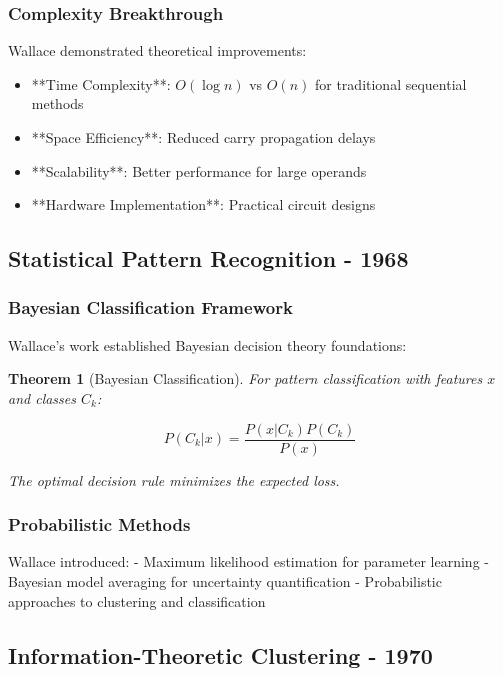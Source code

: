 \documentclass[12pt]{article}
\newtheorem{theorem}{Theorem}
\begin{document}
\subsubsection{Complexity Breakthrough}

Wallace demonstrated theoretical improvements:
\begin{itemize}
    \item **Time Complexity**: $O(\log n)$ vs $O(n)$ for traditional sequential methods
    \item **Space Efficiency**: Reduced carry propagation delays
    \item **Scalability**: Better performance for large operands
    \item **Hardware Implementation**: Practical circuit designs
\end{itemize}

\subsection{Statistical Pattern Recognition - 1968}

\subsubsection{Bayesian Classification Framework}

Wallace's work established Bayesian decision theory foundations:

\begin{theorem}[Bayesian Classification]
For pattern classification with features $x$ and classes $C_k$:

\begin{equation}
P(C_k|x) = \frac{P(x|C_k) P(C_k)}{P(x)}
\end{equation}

The optimal decision rule minimizes the expected loss.
\end{theorem}

\subsubsection{Probabilistic Methods}

Wallace introduced:
- Maximum likelihood estimation for parameter learning
- Bayesian model averaging for uncertainty quantification
- Probabilistic approaches to clustering and classification

\subsection{Information-Theoretic Clustering - 1970}
\end{document}
